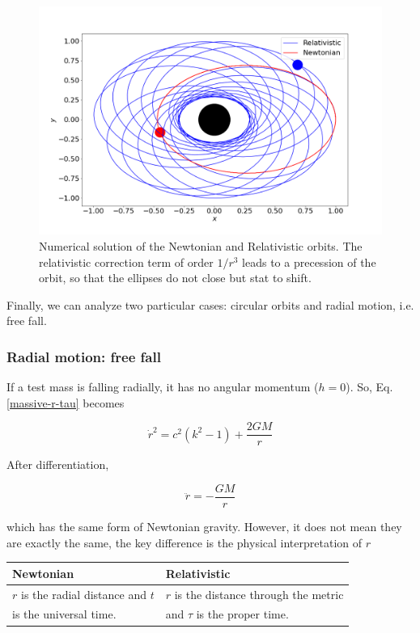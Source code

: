 \documentclass[letterpaper,11pt,onecolumn]{article}
\begin{document}
\begin{figure}[h!]
    \centering
    \includegraphics[width=0.8\linewidth]{Presentations/Images/2_class_rel_orbit.png}
    \caption{Numerical solution of the Newtonian and Relativistic orbits. The relativistic correction term of order $1/r^{3}$ leads to a precession of the orbit, so that the ellipses do not close but stat to shift.}
    \label{fig:relnew}
\end{figure}


Finally, we can analyze two particular cases: circular orbits and radial motion, i.e. free fall. 

\subsubsection{Radial motion: free fall}

If a test mass is falling radially, it has no angular momentum ($h=0$). So, Eq. \ref{massive-r-tau} becomes 

\begin{equation} \label{massive-radialcase-main}
    \dot{r}^2 = c^2(k^2-1) + \frac{2GM}{r}
\end{equation}

After differentiation, 

\begin{equation*}
    \ddot{r} = - \frac{GM}{r}
\end{equation*}

which has the same form of Newtonian gravity. However, it does not mean they are exactly the same, the key difference is the physical interpretation of $r$

\begin{table}[h!]
    \centering
    \begin{tabular}{l|l}
         Newtonian & Relativistic  \\ \hline
         $r$ is the radial distance and $t$ & $r$ is the distance through the metric \\
         is the universal time. & and $\tau$ is the proper time. 
    \end{tabular}
\end{table}
\end{document}

